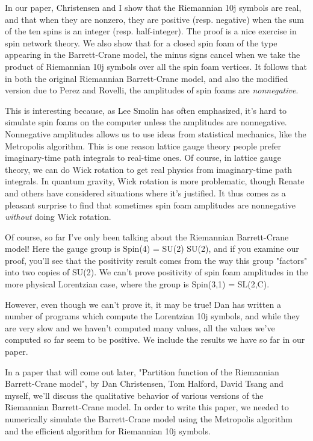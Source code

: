 In our paper, Christensen and I show that the Riemannian 10j symbols 
are real, and that when they are nonzero, they are positive (resp. 
negative) when the sum of the ten spins is an integer (resp. half-integer).  
The proof is a nice exercise in spin network theory.  We also show that 
for a closed spin foam of the type appearing in the Barrett-Crane model, 
the minus signs cancel when we take the product of Riemannian 10j symbols 
over all the spin foam vertices.  It follows that in both the original 
Riemannian Barrett-Crane model, and also the modified version due to 
Perez and Rovelli, the amplitudes of spin foams are \emph{nonnegative}.

This is interesting because, as Lee Smolin has often emphasized, 
it's hard to simulate spin foams on the computer unless the amplitudes 
are nonnegative.  Nonnegative amplitudes allows us to use ideas from
statistical mechanics, like the Metropolis algorithm.  This is one reason
lattice gauge theory people prefer imaginary-time path integrals to
real-time ones.  Of course, in lattice gauge theory, we can do Wick
rotation to get real physics from imaginary-time path integrals.  In
quantum gravity, Wick rotation is more problematic, though Renate and
others have considered situations where it's justified.  It thus comes 
as a pleasant surprise to find that sometimes spin foam amplitudes are
nonnegative \emph{without} doing Wick rotation.  

Of course, so far I've only been talking about the Riemannian
Barrett-Crane model!  Here the gauge group is Spin(4) = SU(2) \times  SU(2),
and if you examine our proof, you'll see that the positivity result
comes from the way this group "factors" into two copies of SU(2).  
We can't prove positivity of spin foam amplitudes in the more physical
Lorentzian case, where the group is Spin(3,1) = SL(2,C).

However, even though we can't prove it, it may be true!  Dan has
written a number of programs which compute the Lorentzian 10j symbols,
and while they are very slow and we haven't computed many values, all 
the values we've computed so far seem to be positive.  We include 
the results we have so far in our paper.  

In a paper that will come out later, "Partition function of the
Riemannian Barrett-Crane model", by Dan Christensen, Tom Halford, David
Tsang and myself, we'll discuss the qualitative behavior of various
versions of the Riemannian Barrett-Crane model.  In order to write
this paper, we needed to numerically simulate the Barrett-Crane model
using the Metropolis algorithm and the efficient algorithm for Riemannian 
10j symbols.  

